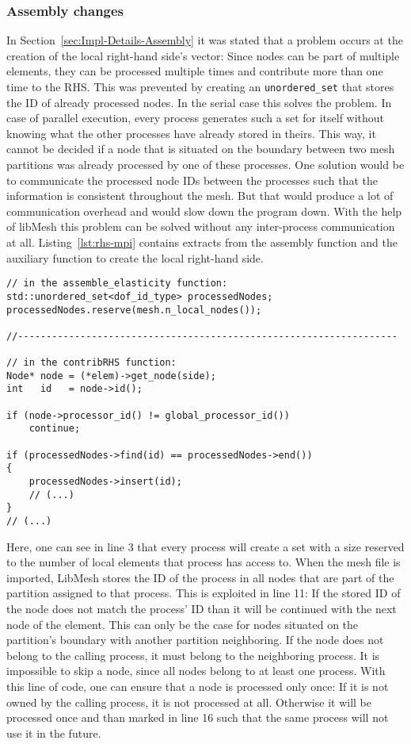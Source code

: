   
  
  \subsubsection{Assembly changes}\label{sec:Impl-Parallel-Assembly}
   In Section~\ref{sec:Impl-Details-Assembly} it was stated that a problem occurs at the creation of the local right-hand side's vector: Since nodes can be part of multiple elements, they can be processed multiple times and contribute more than one time to the RHS. This was prevented by creating an \texttt{unordered\_set} that stores the ID of already processed nodes. In the serial case this solves the problem. In case of parallel execution, every process generates such a set for itself without knowing what the other processes have already stored in theirs. This way, it cannot be decided if a node that is situated on the boundary between two mesh partitions was already processed by one of these processes. One solution would be to communicate the processed node IDs between the processes such that the information is consistent throughout the mesh. But that would produce a lot of communication overhead and would slow down the program down. With the help of libMesh this problem can be solved without any inter-process communication at all. Listing~\ref{lst:rhs-mpi} contains extracts from the assembly function and the auxiliary function to create the local right-hand side.
\begin{lstlisting}[caption=Process local nodes only,label=lst:rhs-mpi,keepspaces=true]
// in the assemble_elasticity function:
std::unordered_set<dof_id_type> processedNodes;
processedNodes.reserve(mesh.n_local_nodes());

//-------------------------------------------------------------------

// in the contribRHS function:
Node* node = (*elem)->get_node(side);
int   id   = node->id();

if (node->processor_id() != global_processor_id())
	continue;
	
if (processedNodes->find(id) == processedNodes->end())
{
	processedNodes->insert(id);
	// (...)
}
// (...)
\end{lstlisting}
   Here, one can see in line 3 that every process will create a set with a size reserved to the number of local elements that process has access to. When the mesh file is imported, LibMesh stores the ID of the process in all nodes that are part of the partition assigned to that process. This is exploited in line 11: If the stored ID of the node does not match the process' ID than it will be continued with the next node of the element. This can only be the case for nodes situated on the partition's boundary with another partition neighboring. If the node does not belong to the calling process, it must belong to the neighboring process. It is impossible to skip a node, since all nodes belong to at least one process. With this line of code, one can ensure that a node is processed only once: If it is not owned by the calling process, it is not processed at all. Otherwise it will be processed once and than marked in line 16 such that the same process will not use it in the future.